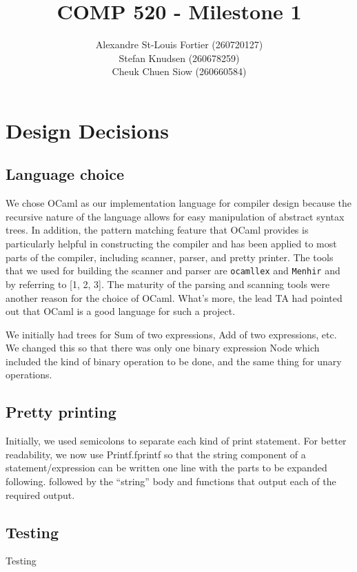 \documentclass{article}
\begin{document}
\pagestyle{empty}

\title{COMP 520 - Milestone 1}
\author{
Alexandre St-Louis Fortier (260720127)\\
Stefan Knudsen (260678259)\\
Cheuk Chuen Siow (260660584)}
\maketitle

\raggedright
\section*{Design Decisions}
\subsection*{Language choice}
We chose OCaml as our implementation language for compiler design because the recursive nature of the language allows for easy manipulation of abstract syntax trees. In addition, the pattern matching feature that OCaml provides is particularly helpful in constructing the compiler and has been applied to most parts of the compiler, including scanner, parser, and pretty printer. The tools that we used for building the scanner and parser are \verb|ocamllex| and \verb|Menhir| and by referring to [1, 2, 3]. The maturity of the parsing and scanning tools were another reason for the choice of OCaml. What's more, the lead TA had pointed out that OCaml is a good language for such a project. 

We initially had trees for Sum of two expressions, Add of two expressions, etc. We changed this so that there was only one binary expression Node which included the kind of binary operation to be done, and the same thing for unary operations.

\subsection*{Pretty printing}
Initially, we used semicolons to separate each kind of print statement. For better readability, we now use Printf.fprintf so that the string component of a statement/expression can be written one line with the parts to be expanded following.
followed by the ``string'' body and functions that output each of the required output.

\subsection*{Testing}
Testing 
\end{document}
